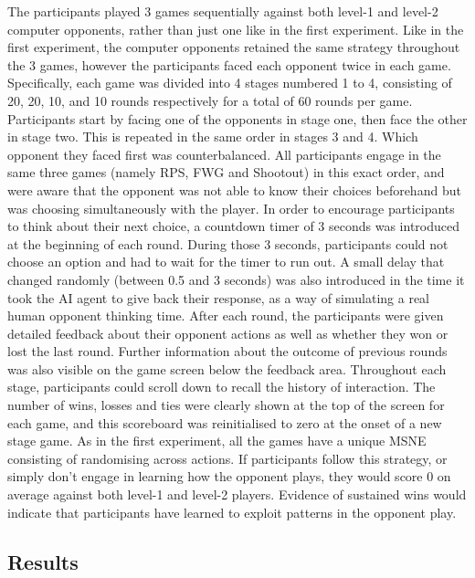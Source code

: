 \documentclass[man,floatsintext]{apa6}
\begin{document}
The participants played 3 games sequentially against both level-1 and level-2 computer opponents, rather than just one like in the first experiment. Like in the first experiment, the computer opponents retained the same strategy throughout the 3 games, however the participants faced each opponent twice in each game. Specifically, each game was divided into 4 stages numbered 1 to 4, consisting of 20, 20, 10, and 10 rounds respectively for a total of 60 rounds per game. Participants start by facing one of the opponents in stage one, then face the other in stage two. This is repeated in the same order in stages 3 and 4. Which opponent they faced first was counterbalanced. All participants engage in the same three games (namely RPS, FWG and Shootout) in this exact order, and were aware that the opponent was not able to know their choices beforehand but was choosing simultaneously with the player.
In order to encourage participants to think about their next choice, a countdown timer of 3 seconds was introduced at the beginning of each round. During those 3 seconds, participants could not choose an option and had to wait for the timer to run out. A small delay that changed randomly (between 0.5 and 3 seconds) was also introduced in the time it took the AI agent to give back their response, as a way of simulating a real human opponent thinking time. After each round, the participants were given detailed feedback about their opponent actions as well as whether they won or lost the last round. Further information about the outcome of previous rounds was also visible on the game screen below the feedback area. Throughout each stage, participants could scroll down to recall the history of interaction. The number of wins, losses and ties were clearly shown at the top of the screen for each game, and this scoreboard was reinitialised to zero at the onset of a new stage game.
As in the first experiment, all the games have a unique MSNE consisting of randomising across actions. If participants follow this strategy, or simply don't engage in learning how the opponent plays, they would score 0 on average against both level-1 and level-2 players. Evidence of sustained wins would indicate that participants have learned to exploit patterns in the opponent play.

\hypertarget{results-1}{%
\subsection{Results}\label{results-1}}
\end{document}
